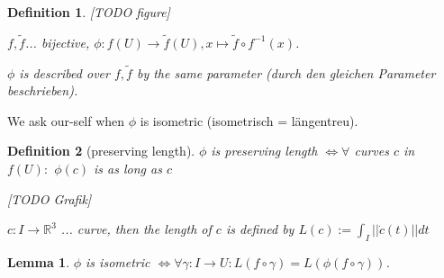 \documentclass[]{article}
\newtheorem{lemma}{Lemma}
\newtheorem{definition}{Definition}
\begin{document}
\begin{definition}
	
	[TODO figure]
	
	$f, \tilde{f}$... bijective, $\phi:f(U) \rightarrow \tilde{f}(U), x \mapsto \tilde{f} \circ f^{-1}(x)$.
	
	$\phi$ is described over $f, \tilde{f}$ by the same parameter (durch den gleichen Parameter beschrieben).
\end{definition}

We ask our-self when $\phi$ is isometric (isometrisch = längentreu).

\begin{definition}[preserving length]
	$\phi$ is preserving length $\iff \forall $ curves $c$ in $f(U):$ $\phi(c)$ is as long as $c$
	
	[TODO Grafik]
	
	$c:I \rightarrow \mathbb{R}^3$ ... curve, then the length of $c$ is defined by $L(c) := \int_{I} ||\dot{c}(t)|| dt$
\end{definition} 

\begin{lemma}
	$\phi$ is isometric $\iff \forall \gamma : I \rightarrow U: L(f \circ \gamma) = L(\phi(f \circ \gamma))$.
\end{lemma}
\end{document}
